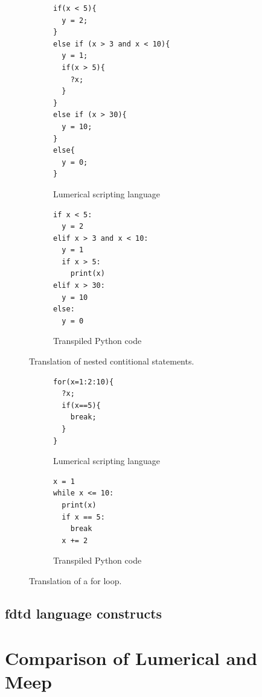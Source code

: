 \begin{figure}[H]\label{fig:lumerical-pyhton-expression}
  \centering

  \begin{subfigure}[t]{0.4\textwidth}
    \begin{lstlisting}[style=lumerical]
if(x < 5){
  y = 2;
}
else if (x > 3 and x < 10){
  y = 1;
  if(x > 5){
    ?x;
  }
}
else if (x > 30){
  y = 10;
}
else{
  y = 0;
}
    \end{lstlisting}
    \caption{Lumerical scripting language}
  \end{subfigure}
  \hfill
  \begin{subfigure}[t]{0.4\textwidth}
    \begin{lstlisting}[style=python]
if x < 5:
  y = 2
elif x > 3 and x < 10:
  y = 1
  if x > 5:
    print(x)
elif x > 30:
  y = 10
else:
  y = 0
    \end{lstlisting}
    \caption{Transpiled Python code}
  \end{subfigure}

  \caption{Translation of nested contitional statements.}
\end{figure}




\begin{figure}[H]\label{fig:lumerical-pyhton-expression}
  \centering

  \begin{subfigure}[t]{0.4\textwidth}
    \begin{lstlisting}[style=lumerical]
for(x=1:2:10){
  ?x;
  if(x==5){
    break;
  }
}
    \end{lstlisting}
    \caption{Lumerical scripting language}
  \end{subfigure}
  \hfill
  \begin{subfigure}[t]{0.4\textwidth}
    \begin{lstlisting}[style=python]
x = 1
while x <= 10:
  print(x)
  if x == 5:
    break
  x += 2
    \end{lstlisting}
    \caption{Transpiled Python code}
  \end{subfigure}

  \caption{Translation of a for loop.}
\end{figure}

\subsection{\gls{fdtd} language constructs}


\section{Comparison of Lumerical and Meep}

